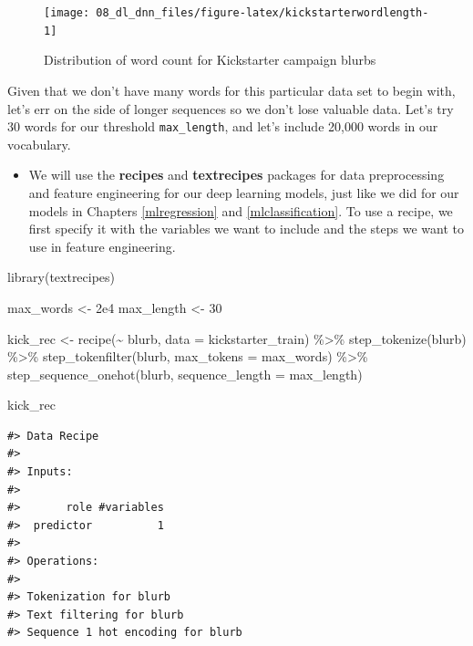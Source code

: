 \documentclass[
]{krantz}
\makeatletter
\newenvironment{Shaded}{\begin{snugshade}}{\end{snugshade}}
\newcommand{\AttributeTok}[1]{\textcolor[rgb]{0.77,0.63,0.00}{#1}}
\newcommand{\DecValTok}[1]{\textcolor[rgb]{0.00,0.00,0.81}{#1}}
\newcommand{\FloatTok}[1]{\textcolor[rgb]{0.00,0.00,0.81}{#1}}
\newcommand{\FunctionTok}[1]{\textcolor[rgb]{0.00,0.00,0.00}{#1}}
\newcommand{\NormalTok}[1]{#1}
\newcommand{\OtherTok}[1]{\textcolor[rgb]{0.56,0.35,0.01}{#1}}
\newcommand{\SpecialCharTok}[1]{\textcolor[rgb]{0.00,0.00,0.00}{#1}}
\newenvironment{kframe}{%
\medskip{}
\setlength{\fboxsep}{.8em}
 \def\at@end@of@kframe{}%
 \ifinner\ifhmode%
  \def\at@end@of@kframe{\end{minipage}}%
  \begin{minipage}{\columnwidth}%
 \fi\fi%
 \def\FrameCommand##1{\hskip\@totalleftmargin \hskip-\fboxsep
 \colorbox{shadecolor}{##1}\hskip-\fboxsep
     \hskip-\linewidth \hskip-\@totalleftmargin \hskip\columnwidth}%
 \MakeFramed {\advance\hsize-\width
   \@totalleftmargin\z@ \linewidth\hsize
   \@setminipage}}%
 {\par\unskip\endMakeFramed%
 \at@end@of@kframe}
\renewenvironment{Shaded}{\begin{kframe}}{\end{kframe}}
\newenvironment{rmdblock}[1]
  {\begin{shaded*}
  \begin{itemize}[left = -1cm, labelsep = 1cm]
  \renewcommand{\labelitemi}{
    \raisebox{-.7\height}[0pt][0pt]{
      {\setkeys{Gin}{width=3em,keepaspectratio}\texttt{[image: images/\#1]}}
    }
  }
 
  \item
  }
  {
  \end{itemize}
  \end{shaded*}
  }
\newenvironment{rmdpackage}
  {\begin{rmdblock}{package}}
  {\end{rmdblock}}
\makeatother
\begin{document}
\begin{figure}

{\centering \texttt{[image: 08\_dl\_dnn\_files/figure-latex/kickstarterwordlength-1]} 

}

\caption{Distribution of word count for Kickstarter campaign blurbs}\label{fig:kickstarterwordlength}
\end{figure}

Given that we don't have many words for this particular data set to begin with, let's err on the side of longer sequences so we don't lose valuable data. Let's try 30 words for our threshold \texttt{max\_length}, and let's include 20,000 words in our vocabulary.

\begin{rmdpackage}
We will use the \textbf{recipes} and \textbf{textrecipes} packages for data preprocessing and feature engineering for our deep learning models, just like we did for our models in Chapters \ref{mlregression} and \ref{mlclassification}. To use a recipe, we first specify it with the variables we want to include and the steps we want to use in feature engineering.
\end{rmdpackage}

\begin{Shaded}
\begin{Highlighting}[]
\FunctionTok{library}\NormalTok{(textrecipes)}

\NormalTok{max\_words }\OtherTok{\textless{}{-}} \FloatTok{2e4}
\NormalTok{max\_length }\OtherTok{\textless{}{-}} \DecValTok{30}

\NormalTok{kick\_rec }\OtherTok{\textless{}{-}} \FunctionTok{recipe}\NormalTok{(}\SpecialCharTok{\textasciitilde{}}\NormalTok{ blurb, }\AttributeTok{data =}\NormalTok{ kickstarter\_train) }\SpecialCharTok{\%\textgreater{}\%}
  \FunctionTok{step\_tokenize}\NormalTok{(blurb) }\SpecialCharTok{\%\textgreater{}\%}
  \FunctionTok{step\_tokenfilter}\NormalTok{(blurb, }\AttributeTok{max\_tokens =}\NormalTok{ max\_words) }\SpecialCharTok{\%\textgreater{}\%}
  \FunctionTok{step\_sequence\_onehot}\NormalTok{(blurb, }\AttributeTok{sequence\_length =}\NormalTok{ max\_length)}

\NormalTok{kick\_rec}
\end{Highlighting}
\end{Shaded}

\begin{verbatim}
#> Data Recipe
#> 
#> Inputs:
#> 
#>       role #variables
#>  predictor          1
#> 
#> Operations:
#> 
#> Tokenization for blurb
#> Text filtering for blurb
#> Sequence 1 hot encoding for blurb
\end{verbatim}
\end{document}
